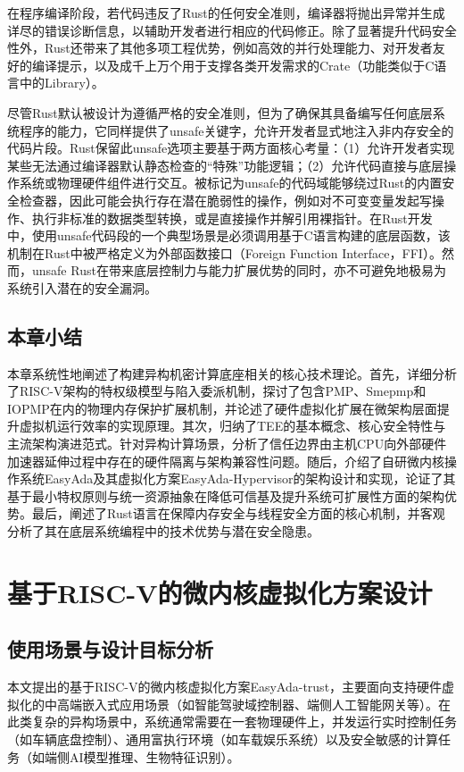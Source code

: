 \documentclass[master, vlined, review]{DissertUESTC}
\begin{document}
	在程序编译阶段，若代码违反了Rust的任何安全准则，编译器将抛出异常并生成详尽的错误诊断信息，以辅助开发者进行相应的代码修正。除了显著提升代码安全性外，Rust还带来了其他多项工程优势，例如高效的并行处理能力、对开发者友好的编译提示，以及成千上万个用于支撑各类开发需求的Crate（功能类似于C语言中的Library）。
	
	尽管Rust默认被设计为遵循严格的安全准则，但为了确保其具备编写任何底层系统程序的能力，它同样提供了unsafe关键字，允许开发者显式地注入非内存安全的代码片段。Rust保留此unsafe选项主要基于两方面核心考量：（1）允许开发者实现某些无法通过编译器默认静态检查的“特殊”功能逻辑；（2）允许代码直接与底层操作系统或物理硬件组件进行交互。被标记为unsafe的代码域能够绕过Rust的内置安全检查器，因此可能会执行存在潜在脆弱性的操作，例如对不可变变量发起写操作、执行非标准的数据类型转换，或是直接操作并解引用裸指针。在Rust开发中，使用unsafe代码段的一个典型场景是必须调用基于C语言构建的底层函数，该机制在Rust中被严格定义为外部函数接口（Foreign Function Interface，FFI）。然而，unsafe Rust在带来底层控制力与能力扩展优势的同时，亦不可避免地极易为系统引入潜在的安全漏洞。
	
	\section{本章小结}
	本章系统性地阐述了构建异构机密计算底座相关的核心技术理论。首先，详细分析了RISC-V架构的特权级模型与陷入委派机制，探讨了包含PMP、Smepmp和IOPMP在内的物理内存保护扩展机制，并论述了硬件虚拟化扩展在微架构层面提升虚拟机运行效率的实现原理。其次，归纳了TEE的基本概念、核心安全特性与主流架构演进范式。针对异构计算场景，分析了信任边界由主机CPU向外部硬件加速器延伸过程中存在的硬件隔离与架构兼容性问题。随后，介绍了自研微内核操作系统EasyAda及其虚拟化方案EasyAda-Hypervisor的架构设计和实现，论证了其基于最小特权原则与统一资源抽象在降低可信基及提升系统可扩展性方面的架构优势。最后，阐述了Rust语言在保障内存安全与线程安全方面的核心机制，并客观分析了其在底层系统编程中的技术优势与潜在安全隐患。
	
	\chapter{基于RISC-V的微内核虚拟化方案设计}
	\section{使用场景与设计目标分析}
	
	本文提出的基于RISC-V的微内核虚拟化方案EasyAda-trust，主要面向支持硬件虚拟化的中高端嵌入式应用场景（如智能驾驶域控制器、端侧人工智能网关等）。在此类复杂的异构场景中，系统通常需要在一套物理硬件上，并发运行实时控制任务（如车辆底盘控制）、通用富执行环境（如车载娱乐系统）以及安全敏感的计算任务（如端侧AI模型推理、生物特征识别）。
	
\end{document}
